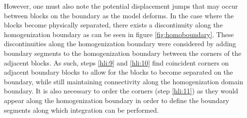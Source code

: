 However, one must also note the potential displacement jumps that may occur between blocks on the boundary as the model deforms. In the case where the blocks become physically separated, there exists a discontinuity along the homogenization boundary as can be seen in figure \ref{fig:homoboundary}. These discontinuities along the homogenization boundary were considered by adding boundary segments to the homogenization boundary between the corners of the adjacent blocks. As such, steps \ref{hli:9} and \ref{hli:10} find coincident corners on adjacent boundary blocks to allow for the blocks to become separated on the boundary, while still maintaining connectivity along the homogenization domain boundary. It is also necessary to order the corners (step \ref{hli:11}) as they would appear along the homogenization boundary in order to define the boundary segments along which integration can be performed.

